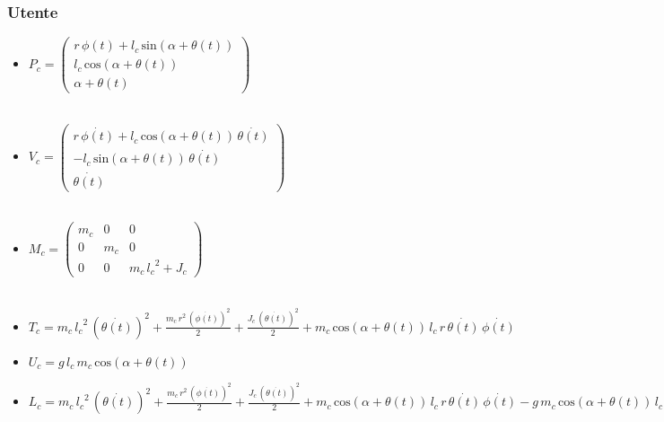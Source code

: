 \subsubsection{Utente}
\begin{itemize}
	
	\item \textbf{$P_c = \left(\begin{array}{c}
		r\,\phi \left(t\right)+l_c \,\mathrm{sin}\left(\alpha +\theta \left(t\right)\right)\\
		l_c \,\mathrm{cos}\left(\alpha +\theta \left(t\right)\right)\\
		\alpha +\theta \left(t\right)
		\end{array}\right)$}
	\\\\
	\item \textbf{$V_c = \left(\begin{array}{c}
		r\,\dot{\phi \left(t\right)}+l_c \,\mathrm{cos}\left(\alpha +\theta \left(t\right)\right)\,\dot{\theta \left(t\right)}\\
		-l_c \,\mathrm{sin}\left(\alpha +\theta \left(t\right)\right)\,\dot{\theta \left(t\right)}\\
		\dot{\theta \left(t\right)}
		\end{array}\right)$}
	\\\\
	\item \textbf{$M_c = \left(\begin{array}{ccc}
		m_c  & 0 & 0\\
		0 & m_c  & 0\\
		0 & 0 & m_c \,{l_c }^2 +J_c 
		\end{array}\right)$}
	\\\\
	\item \textbf{$T_c = m_c \,{l_c }^2 \,{{\left(\dot{\theta \left(t\right)}\right)}}^2 +\frac{m_c \,r^2 \,{{\left(\dot{\phi \left(t\right)}\right)}}^2 }{2}+\frac{J_c \,{{\left(\dot{\theta \left(t\right)}\right)}}^2 }{2}+m_c \,\mathrm{cos}\left(\alpha +\theta \left(t\right)\right)\,l_c \,r\,\dot{\theta \left(t\right)}\,\dot{\phi \left(t\right)}$}
	\\
	\item \textbf{$U_c = g\,l_c \,m_c \,\mathrm{cos}\left(\alpha +\theta \left(t\right)\right)$}
	\\
	\item \textbf{$L_c = m_c \,{l_c }^2 \,{{\left(\dot{\theta \left(t\right)}\right)}}^2 +\frac{m_c \,r^2 \,{{\left(\dot{\phi \left(t\right)}\right)}}^2 }{2}+\frac{J_c \,{{\left(\dot{\theta \left(t\right)}\right)}}^2 }{2}+m_c \,\mathrm{cos}\left(\alpha +\theta \left(t\right)\right)\,l_c \,r\,\dot{\theta \left(t\right)}\,\dot{\phi \left(t\right)}-g\,m_c \,\mathrm{cos}\left(\alpha +\theta \left(t\right)\right)\,l_c$}
\end{itemize}
